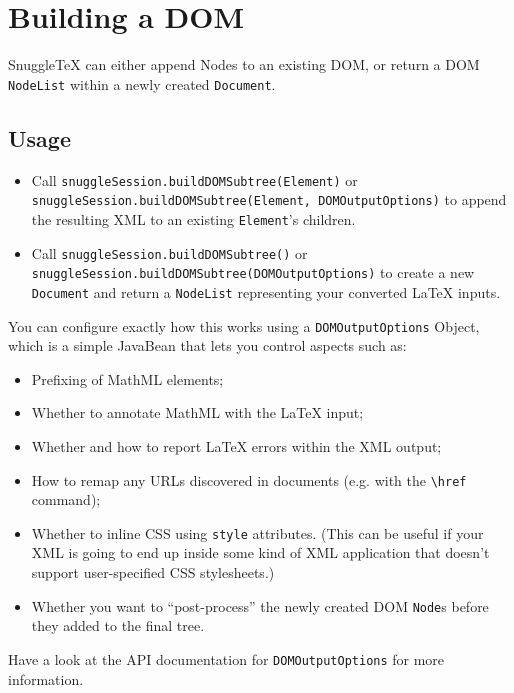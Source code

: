 
\section*{Building a DOM}

SnuggleTeX can either append Nodes to an existing DOM, or return a DOM
\verb|NodeList| within a newly created \verb|Document|.

\subsection*{Usage}

\begin{itemize}
  \item
    Call \verb|snuggleSession.buildDOMSubtree(Element)|
    or \verb|snuggleSession.buildDOMSubtree(Element, DOMOutputOptions)|
    to append the resulting XML to an existing \verb|Element|'s children.

  \item
    Call \verb|snuggleSession.buildDOMSubtree()|
    or \verb|snuggleSession.buildDOMSubtree(DOMOutputOptions)|
    to create a new \verb|Document| and return a \verb|NodeList| representing
    your converted LaTeX inputs.
\end{itemize}

You can configure exactly how this works using a \verb|DOMOutputOptions| Object,
which is a simple JavaBean that lets you control aspects such as:

\begin{itemize}
  \item Prefixing of MathML elements;
  \item Whether to annotate MathML with the LaTeX input;
  \item Whether and how to report LaTeX errors within the XML output;
  \item How to remap any URLs discovered in documents (e.g. with the \verb|\href| command);
  \item Whether to inline CSS using \verb|style| attributes. (This can be useful if your XML
    is going to end up inside some kind of XML application that doesn't support user-specified
    CSS stylesheets.)
  \item Whether you want to ``post-process'' the newly created DOM \verb|Node|s before they
    added to the final tree.
\end{itemize}

Have a look at the API documentation for \verb|DOMOutputOptions| for more information.
